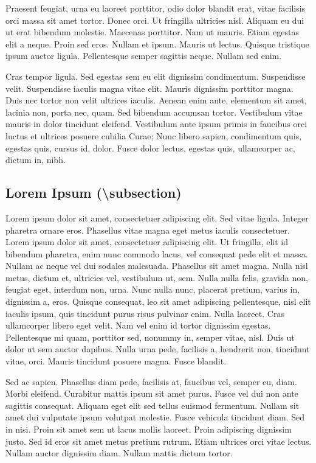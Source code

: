 \documentclass[article,colorback,accentcolor=tud4c]{tudreport}
\begin{document}
    Praesent feugiat, urna eu laoreet porttitor, odio dolor blandit erat, vitae facilisis orci massa sit amet tortor. Donec orci. Ut fringilla ultricies nisl. Aliquam eu dui ut erat bibendum molestie. Maecenas porttitor. Nam ut mauris. Etiam egestas elit a neque. Proin sed eros. Nullam et ipsum. Mauris ut lectus. Quisque tristique ipsum auctor ligula. Pellentesque semper sagittis neque. Nullam sed enim.

    Cras tempor ligula. Sed egestas sem eu elit dignissim condimentum. Suspendisse velit. Suspendisse iaculis magna vitae elit. Mauris dignissim porttitor magna. Duis nec tortor non velit ultrices iaculis. Aenean enim ante, elementum sit amet, lacinia non, porta nec, quam. Sed bibendum accumsan tortor. Vestibulum vitae mauris in dolor tincidunt eleifend. Vestibulum ante ipsum primis in faucibus orci luctus et ultrices posuere cubilia Curae; Nunc libero sapien, condimentum quis, egestas quis, cursus id, dolor. Fusce dolor lectus, egestas quis, ullamcorper ac, dictum in, nibh.

  \subsection{Lorem Ipsum (\textbackslash subsection)}

    Lorem ipsum dolor sit amet, consectetuer adipiscing elit. Sed vitae ligula. Integer pharetra ornare eros. Phasellus vitae magna eget metus iaculis consectetuer. Lorem ipsum dolor sit amet, consectetuer adipiscing elit. Ut fringilla, elit id bibendum pharetra, enim nunc commodo lacus, vel consequat pede elit et massa. Nullam ac neque vel dui sodales malesuada. Phasellus sit amet magna. Nulla nisl metus, dictum et, ultricies vel, vestibulum ut, sem. Nulla nulla felis, gravida non, feugiat eget, interdum non, urna. Nunc nulla nunc, placerat pretium, varius in, dignissim a, eros. Quisque consequat, leo sit amet adipiscing pellentesque, nisl elit iaculis ipsum, quis tincidunt purus risus pulvinar enim. Nulla laoreet. Cras ullamcorper libero eget velit. Nam vel enim id tortor dignissim egestas. Pellentesque mi quam, porttitor sed, nonummy in, semper vitae, nisl. Duis ut dolor ut sem auctor dapibus. Nulla urna pede, facilisis a, hendrerit non, tincidunt vitae, orci. Mauris tincidunt posuere magna. Fusce blandit.

    Sed ac sapien. Phasellus diam pede, facilisis at, faucibus vel, semper eu, diam. Morbi eleifend. Curabitur mattis ipsum sit amet purus. Fusce vel dui non ante sagittis consequat. Aliquam eget elit sed tellus euismod fermentum. Nullam sit amet dui vulputate ipsum volutpat molestie. Fusce vehicula tincidunt diam. Sed in nisi. Proin sit amet sem ut lacus mollis laoreet. Proin adipiscing dignissim justo. Sed id eros sit amet metus pretium rutrum. Etiam ultrices orci vitae lectus. Nullam auctor dignissim diam. Nullam mattis dictum tortor.
\end{document}
